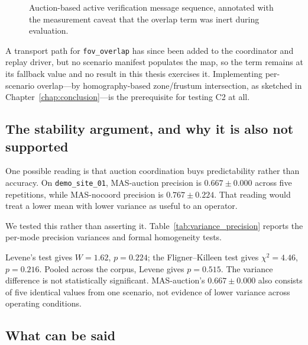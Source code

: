 \begin{figure}[H]
	\centering
	\resizebox{\textwidth}{!}{}
	\caption{Auction-based active verification message sequence, annotated with the measurement caveat that the overlap term was inert during evaluation.}
	\label{fig:auction_sequence}
\end{figure}

A transport path for \texttt{fov\_overlap} has since been added to the coordinator and replay driver, but no scenario manifest populates the map, so the term remains at its fallback value and no result in this thesis exercises it. Implementing per-scenario overlap---by homography-based zone/frustum intersection, as sketched in Chapter~\ref{chap:conclusion}---is the prerequisite for testing C2 at all.

\subsection{The stability argument, and why it is also not supported}

One possible reading is that auction coordination buys predictability rather than accuracy. On \texttt{demo\_site\_01}, MAS-auction precision is $0.667\pm0.000$ across five repetitions, while MAS-nocoord precision is $0.767\pm0.224$. That reading would treat a lower mean with lower variance as useful to an operator.

We tested this rather than asserting it. Table~\ref{tab:variance_precision} reports the per-mode precision variances and formal homogeneity tests.

\begin{table}[H]
	\centering
	\caption{Precision dispersion by mode on \texttt{demo\_site\_01} ($N=5$).}
	\label{tab:variance_precision}
	\small
	
\end{table}

Levene's test gives $W=1.62$, $p=0.224$; the Fligner--Killeen test gives $\chi^{2}=4.46$, $p=0.216$. Pooled across the corpus, Levene gives $p=0.515$. The variance difference is not statistically significant. MAS-auction's $0.667\pm0.000$ also consists of five identical values from one scenario, not evidence of lower variance across operating conditions.

\subsection{What can be said}

